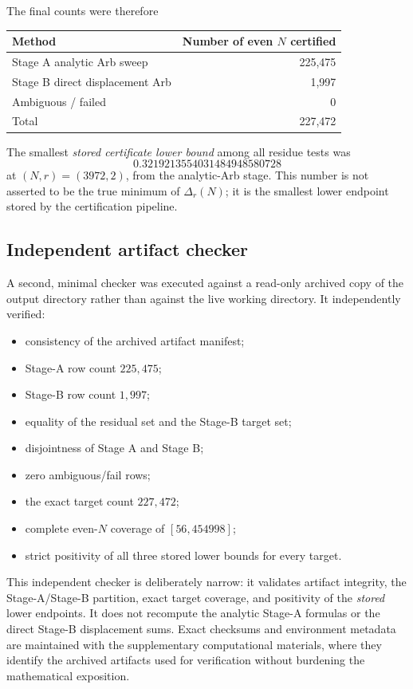 \documentclass[11pt]{article}
\theoremstyle{definition}
\begin{document}
The final counts were therefore
\begin{center}
\begin{tabular}{lr}
\toprule
Method & Number of even $N$ certified\\
\midrule
Stage A analytic Arb sweep & 225,475\\
Stage B direct displacement Arb & 1,997\\
Ambiguous / failed & 0\\
\midrule
Total & 227,472\\
\bottomrule
\end{tabular}
\end{center}
The smallest \emph{stored certificate lower bound} among all residue tests was
\begin{equation}\label{eq:mincert}
0.3219213554031484948580728
\end{equation}
at $(N,r)=(3972,2)$, from the analytic-Arb stage. This number is not asserted to be the true minimum of $\Delta_r(N)$; it is the smallest lower endpoint stored by the certification pipeline.

\subsection{Independent artifact checker}

A second, minimal checker was executed against a read-only archived copy of the output directory rather than against the live working directory. It independently verified:
\begin{itemize}
\item consistency of the archived artifact manifest;
\item Stage-A row count $225{,}475$;
\item Stage-B row count $1{,}997$;
\item equality of the residual set and the Stage-B target set;
\item disjointness of Stage A and Stage B;
\item zero ambiguous/fail rows;
\item the exact target count $227{,}472$;
\item complete even-$N$ coverage of $[56,454998]$;
\item strict positivity of all three stored lower bounds for every target.
\end{itemize}
This independent checker is deliberately narrow: it validates artifact integrity, the Stage-A/Stage-B partition, exact target coverage, and positivity of the \emph{stored} lower endpoints. It does not recompute the analytic Stage-A formulas or the direct Stage-B displacement sums. Exact checksums and environment metadata are maintained with the supplementary computational materials, where they identify the archived artifacts used for verification without burdening the mathematical exposition.
\end{document}
